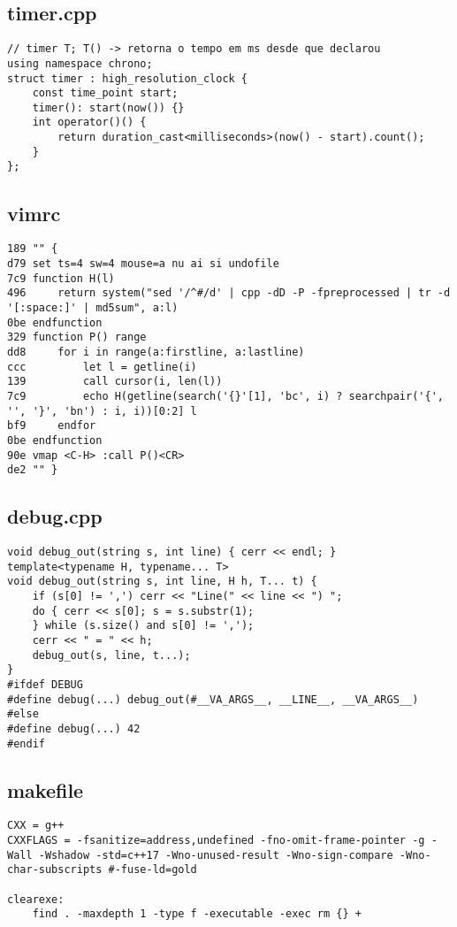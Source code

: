 \documentclass[11pt, a4paper, twoside]{article}
\begin{document}
\subsection{timer.cpp}
\begin{lstlisting}
// timer T; T() -> retorna o tempo em ms desde que declarou
using namespace chrono;
struct timer : high_resolution_clock {
	const time_point start;
	timer(): start(now()) {}
	int operator()() {
		return duration_cast<milliseconds>(now() - start).count();
	}
};
\end{lstlisting}

\subsection{vimrc}
\begin{lstlisting}
189 "" {
d79 set ts=4 sw=4 mouse=a nu ai si undofile
7c9 function H(l)
496 	return system("sed '/^#/d' | cpp -dD -P -fpreprocessed | tr -d '[:space:]' | md5sum", a:l)
0be endfunction
329 function P() range
dd8 	for i in range(a:firstline, a:lastline)
ccc 		let l = getline(i)
139 		call cursor(i, len(l))
7c9 		echo H(getline(search('{}'[1], 'bc', i) ? searchpair('{', '', '}', 'bn') : i, i))[0:2] l
bf9 	endfor
0be endfunction
90e vmap <C-H> :call P()<CR>
de2 "" }
\end{lstlisting}

\subsection{debug.cpp}
\begin{lstlisting}
void debug_out(string s, int line) { cerr << endl; }
template<typename H, typename... T>
void debug_out(string s, int line, H h, T... t) {
    if (s[0] != ',') cerr << "Line(" << line << ") ";
    do { cerr << s[0]; s = s.substr(1);
    } while (s.size() and s[0] != ',');
    cerr << " = " << h;
    debug_out(s, line, t...);
}
#ifdef DEBUG
#define debug(...) debug_out(#__VA_ARGS__, __LINE__, __VA_ARGS__)
#else
#define debug(...) 42
#endif
\end{lstlisting}

\subsection{makefile}
\begin{lstlisting}
CXX = g++
CXXFLAGS = -fsanitize=address,undefined -fno-omit-frame-pointer -g -Wall -Wshadow -std=c++17 -Wno-unused-result -Wno-sign-compare -Wno-char-subscripts #-fuse-ld=gold

clearexe:
	find . -maxdepth 1 -type f -executable -exec rm {} +
\end{lstlisting}
\end{document}
